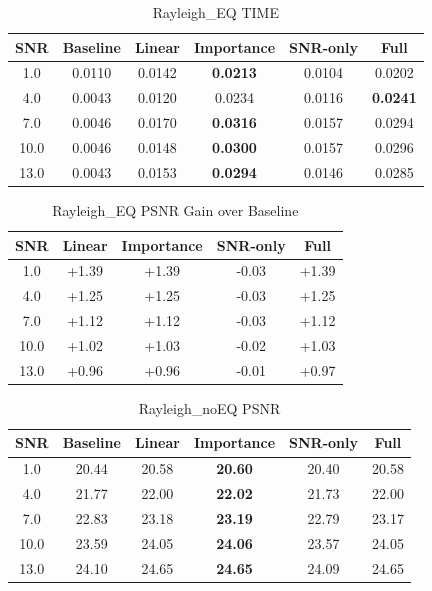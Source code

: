 \begin{table}[h]
\centering
\caption{Rayleigh_EQ TIME}
\begin{tabular}{c|ccccc}
\hline
SNR & Baseline & Linear & Importance & SNR-only & Full \\ \hline
1.0 & 0.0110 & 0.0142 & \textbf{0.0213} & 0.0104 & 0.0202 \\
4.0 & 0.0043 & 0.0120 & 0.0234 & 0.0116 & \textbf{0.0241} \\
7.0 & 0.0046 & 0.0170 & \textbf{0.0316} & 0.0157 & 0.0294 \\
10.0 & 0.0046 & 0.0148 & \textbf{0.0300} & 0.0157 & 0.0296 \\
13.0 & 0.0043 & 0.0153 & \textbf{0.0294} & 0.0146 & 0.0285 \\
\hline
\end{tabular}
\end{table}

\begin{table}[h]
\centering
\caption{Rayleigh_EQ PSNR Gain over Baseline}
\begin{tabular}{c|cccc}
\hline
SNR & Linear & Importance & SNR-only & Full \\ \hline
1.0 & +1.39 & +1.39 & -0.03 & +1.39 \\
4.0 & +1.25 & +1.25 & -0.03 & +1.25 \\
7.0 & +1.12 & +1.12 & -0.03 & +1.12 \\
10.0 & +1.02 & +1.03 & -0.02 & +1.03 \\
13.0 & +0.96 & +0.96 & -0.01 & +0.97 \\
\hline
\end{tabular}
\end{table}
\begin{table}[h]
\centering
\caption{Rayleigh_noEQ PSNR}
\begin{tabular}{c|ccccc}
\hline
SNR & Baseline & Linear & Importance & SNR-only & Full \\ \hline
1.0 & 20.44 & 20.58 & \textbf{20.60} & 20.40 & 20.58 \\
4.0 & 21.77 & 22.00 & \textbf{22.02} & 21.73 & 22.00 \\
7.0 & 22.83 & 23.18 & \textbf{23.19} & 22.79 & 23.17 \\
10.0 & 23.59 & 24.05 & \textbf{24.06} & 23.57 & 24.05 \\
13.0 & 24.10 & 24.65 & \textbf{24.65} & 24.09 & 24.65 \\
\hline
\end{tabular}
\end{table}

